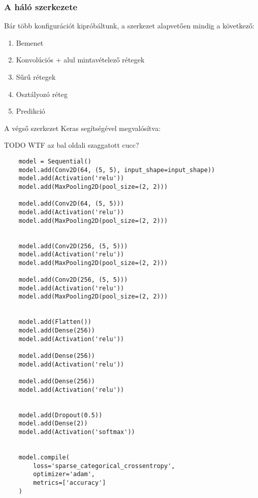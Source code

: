 \subsubsection{A háló szerkezete}

Bár több konfigurációt kipróbáltunk, a szerkezet alapvetően mindig a következő:



\begin{enumerate} [itemsep=-1ex]
	\item Bemenet
	\item Konvolúciós + alul mintavételező rétegek
	\item Sűrű rétegek
	\item Osztályozó réteg
	\item Predikció
\end{enumerate}

A végső szerkezet Keras segítségével megvalósítva:

TODO WTF az bal oldali szaggatott cucc?

\lstset{language=Python}
\begin{lstlisting}  
	model = Sequential()
	model.add(Conv2D(64, (5, 5), input_shape=input_shape))
	model.add(Activation('relu'))
	model.add(MaxPooling2D(pool_size=(2, 2)))
	
	model.add(Conv2D(64, (5, 5)))
	model.add(Activation('relu'))
	model.add(MaxPooling2D(pool_size=(2, 2)))
	
	
	model.add(Conv2D(256, (5, 5)))
	model.add(Activation('relu'))
	model.add(MaxPooling2D(pool_size=(2, 2)))
	
	model.add(Conv2D(256, (5, 5)))
	model.add(Activation('relu'))
	model.add(MaxPooling2D(pool_size=(2, 2)))
	
	
	model.add(Flatten())
	model.add(Dense(256))
	model.add(Activation('relu'))
	
	model.add(Dense(256))
	model.add(Activation('relu'))
	
	model.add(Dense(256))
	model.add(Activation('relu'))
	
	
	model.add(Dropout(0.5))
	model.add(Dense(2))
	model.add(Activation('softmax'))
	
	
	model.compile(
		loss='sparse_categorical_crossentropy',
		optimizer='adam',
		metrics=['accuracy']
	) 

\end{lstlisting}


